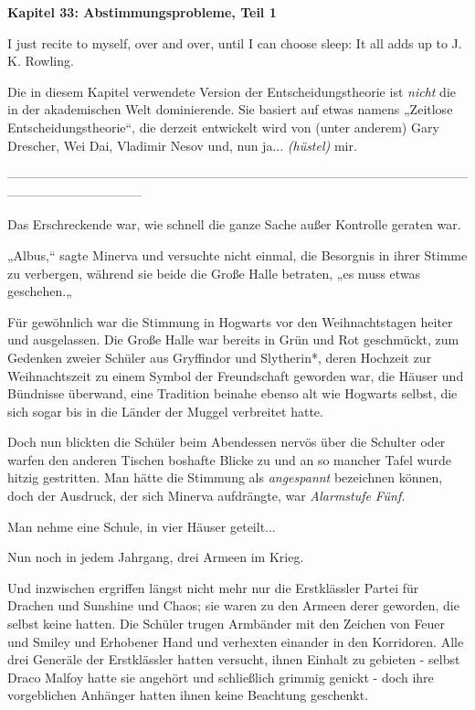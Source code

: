 

\hypertarget{abstimmungsprobleme-teil-1}{%

\textbf{Kapitel 33: Abstimmungsprobleme, Teil 1\\ }

\hfill\break I just recite to myself, over and over, until I can choose sleep: It all adds up to J. K. Rowling.

Die in diesem Kapitel verwendete Version der Entscheidungstheorie ist \emph{nicht} die in der akademischen Welt dominierende. Sie basiert auf etwas namens „Zeitlose Entscheidungstheorie“, die derzeit entwickelt wird von (unter anderem) Gary Drescher, Wei Dai, Vladimir Nesov und, nun ja... \emph{(hüstel)} mir.

--------------------------------------------------------------------------------------------------------------------------------------------

\hfill\break Das Erschreckende war, wie schnell die ganze Sache außer Kontrolle geraten war.

„Albus,“ sagte Minerva und versuchte nicht einmal, die Besorgnis in ihrer Stimme zu verbergen, während sie beide die Große Halle betraten, „es muss etwas geschehen.„

Für gewöhnlich war die Stimmung in Hogwarts vor den Weihnachtstagen heiter und ausgelassen. Die Große Halle war bereits in Grün und Rot geschmückt, zum Gedenken zweier Schüler aus Gryffindor und Slytherin*, deren Hochzeit zur Weihnachtszeit zu einem Symbol der Freundschaft geworden war, die Häuser und Bündnisse überwand, eine Tradition beinahe ebenso alt wie Hogwarts selbst, die sich sogar bis in die Länder der Muggel verbreitet hatte.

Doch nun blickten die Schüler beim Abendessen nervös über die Schulter oder warfen den anderen Tischen boshafte Blicke zu und an so mancher Tafel wurde hitzig gestritten. Man hätte die Stimmung als \emph{angespannt} bezeichnen können, doch der Ausdruck, der sich Minerva aufdrängte, war \emph{Alarmstufe} \emph{Fünf.}

Man nehme eine Schule, in vier Häuser geteilt...

Nun noch in jedem Jahrgang, drei Armeen im Krieg.

Und inzwischen ergriffen längst nicht mehr nur die Erstklässler Partei für Drachen und Sunshine und Chaos; sie waren zu den Armeen derer geworden, die selbst keine hatten. Die Schüler trugen Armbänder mit den Zeichen von Feuer und Smiley und Erhobener Hand und verhexten einander in den Korridoren. Alle drei Generäle der Erstklässler hatten versucht, ihnen Einhalt zu gebieten - selbst Draco Malfoy hatte sie angehört und schließlich grimmig genickt - doch ihre vorgeblichen Anhänger hatten ihnen keine Beachtung geschenkt.

}
